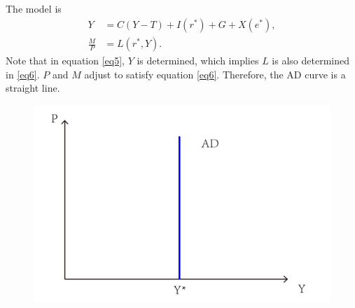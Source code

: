 \documentclass{article}
\begin{document}
\subsection{}
The model is
\begin{align}
    Y &= C(Y - T) + I(r^\ast) + G + X(e^\ast),\label{eq5} \\
    \frac{M}{P} &= L(r^\ast, Y).\label{eq6}
\end{align}
Note that in equation \eqref{eq5}, $Y$ is determined, which implies $L$ is also determined in \eqref{eq6}. $P$ and $M$ adjust to satisfy equation \eqref{eq6}. Therefore, the AD curve is a straight line.
\begin{figure}[h]
    \centering
    \includegraphics[scale=0.15]{figure/3-2.pdf}
\end{figure}
\end{document}
